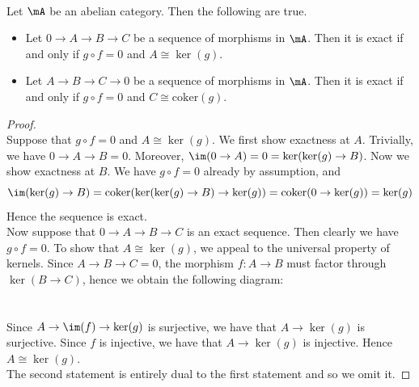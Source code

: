 \documentclass[a4paper]{article}
\begin{document}
\begin{lmm}{}{}\\
Let $\mA$ be an abelian category. Then the following are true. 
\begin{itemize}
\item Let $0\to A\to B\to C$ be a sequence of morphisms in $\mA$. Then it is exact if and only if $g\circ f=0$ and $A\cong\ker(g)$. 
\item Let $A\to B\to C\to 0$ be a sequence of morphisms in $\mA$. Then it is exact if and only if $g\circ f=0$ and $C\cong\text{coker}(g)$. 
\end{itemize}
\begin{proof}\\
Suppose that $g\circ f=0$ and $A\cong\ker(g)$. We first show exactness at $A$. Trivially, we have $0\to A\to B=0$. Moreover, $\im(0\to A)=0=\ker(\ker(g)\to B)$. Now we show exactness at $B$. We have $g\circ f=0$ already by assumption, and $$\im(\ker(g)\to B)=\text{coker}(\ker(\ker(g)\to B)\to\ker(g))=\text{coker}(0\to\ker(g))=\ker(g)$$ Hence the sequence is exact. \\

Now suppose that $0\to A\to B\to C$ is an exact sequence. Then clearly we have $g\circ f=0$. To show that $A\cong\ker(g)$, we appeal to the universal property of kernels. Since $A\to B\to C=0$, the morphism $f:A\to B$ must factor through $\ker(B\to C)$, hence we obtain the following diagram: \\
\\~\\
Since $A\to\im(f)\to\ker(g)$ is surjective, we have that $A\to\ker(g)$ is surjective. Since $f$ is injective, we have that $A\to\ker(g)$ is injective. Hence $A\cong\ker(g)$. \\

The second statement is entirely dual to the first statement and so we omit it. 
\end{proof}
\end{lmm}
\end{document}
